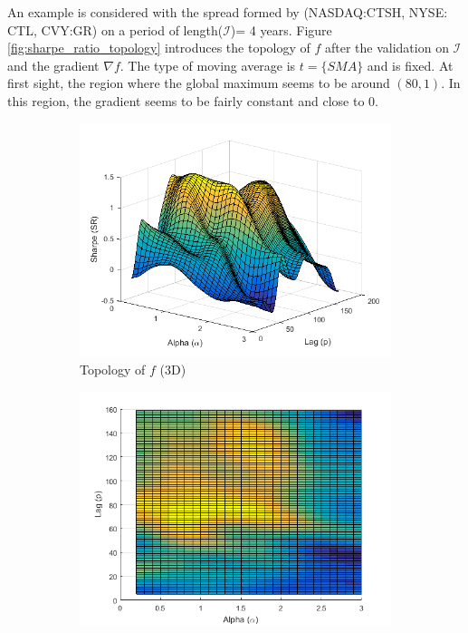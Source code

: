 \documentclass[11pt,a4,twosided,singlespacing,titlepagenumber=on]{scrreprt}
\numberwithin{equation}{chapter} %
\theoremstyle{remark}
\begin{document}
An example is considered with the spread formed by (NASDAQ:CTSH, NYSE: CTL, CVY:GR) on a period of length($\mathcal{I}$)= 4 years. Figure \ref{fig:sharpe_ratio_topology} introduces the topology of $f$ after the validation on $\mathcal{I}$ and the gradient $\nabla f$. The type of moving average is $t = \{ SMA \}$ and is fixed. At first sight, the region where the global maximum seems to be around $(80,1)$. In this region, the gradient seems to be fairly constant and close to 0.

\begin{figure}[H]
    \centering
    \begin{subfigure}[t]{0.49\textwidth}
        \centering
        \includegraphics[width=1\textwidth]{surf/1}
        \caption{Topology of $f$ (3D)}
        \label{}
    \end{subfigure}
    \begin{subfigure}[t]{0.49\textwidth}
        \centering
        \includegraphics[width=1\textwidth]{surf/2}

\end{subfigure}
\end{figure}
\end{document}
